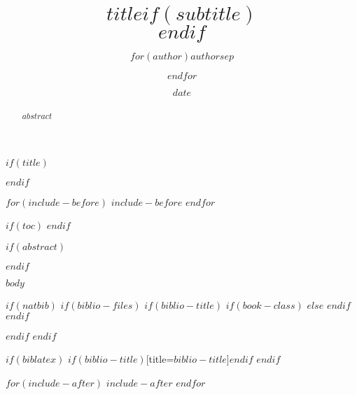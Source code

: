 \documentclass[$if(fontsize)$
                   $fontsize$,
               $endif$
               $if(lang)$
                   $lang$,
               $endif$
               $if(papersize)$
                   $papersize$,
               $endif$
               $for(classoption)$
                   $classoption$
               $sep$,$endfor$]
               {$documentclass$}
\title{$title$$if(subtitle)$\\\vspace{0.5em}{\large $subtitle$}$endif$}
\author{$for(author)$$author$$sep$ \and $endfor$}
\date{$date$}
\begin{document}
$if(title)$
\maketitle
$endif$

$for(include-before)$
$include-before$
$endfor$

$if(toc)$
{
\hypersetup{linkcolor=green}
\setcounter{tocdepth}{$toc-depth$}
\tableofcontents
}
$endif$

$if(abstract)$
\begin{abstract}
$abstract$
\end{abstract}
$endif$

$body$

$if(natbib)$
  $if(biblio-files)$
    $if(biblio-title)$
        $if(book-class)$
         \renewcommand\bibname{$biblio-title$}
        $else$
         \renewcommand\refname{$biblio-title$}
        $endif$
    $endif$
      
  $endif$
$endif$

$if(biblatex)$
\printbibliography$if(biblio-title)$[title=$biblio-title$]$endif$
$endif$

$for(include-after)$
$include-after$
$endfor$
\end{document}
